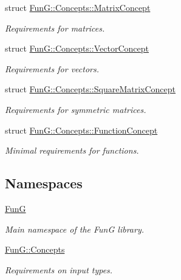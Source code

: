\begin{DoxyCompactItemize}
struct \hyperlink{structFunG_1_1Concepts_1_1MatrixConcept}{Fun\+G\+::\+Concepts\+::\+Matrix\+Concept}
\begin{DoxyCompactList}\small\item\em Requirements for matrices. \end{DoxyCompactList}\item 
struct \hyperlink{structFunG_1_1Concepts_1_1VectorConcept}{Fun\+G\+::\+Concepts\+::\+Vector\+Concept}
\begin{DoxyCompactList}\small\item\em Requirements for vectors. \end{DoxyCompactList}\item 
struct \hyperlink{structFunG_1_1Concepts_1_1SquareMatrixConcept}{Fun\+G\+::\+Concepts\+::\+Square\+Matrix\+Concept}
\begin{DoxyCompactList}\small\item\em Requirements for symmetric matrices. \end{DoxyCompactList}\item 
struct \hyperlink{structFunG_1_1Concepts_1_1FunctionConcept}{Fun\+G\+::\+Concepts\+::\+Function\+Concept}
\begin{DoxyCompactList}\small\item\em Minimal requirements for functions. \end{DoxyCompactList}\end{DoxyCompactItemize}
\subsection*{Namespaces}
\begin{DoxyCompactItemize}
\item 
 \hyperlink{namespaceFunG}{FunG}
\begin{DoxyCompactList}\small\item\em Main namespace of the FunG library. \end{DoxyCompactList}\item 
 \hyperlink{namespaceFunG_1_1Concepts}{Fun\+G\+::\+Concepts}
\begin{DoxyCompactList}\small\item\em Requirements on input types. \end{DoxyCompactList}\end{DoxyCompactItemize}
